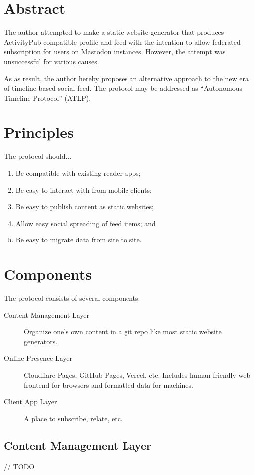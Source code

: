 \documentclass[a4paper,11pt]{article}
\begin{document}
\fulldoctitle



\section*{Abstract}
The author attempted to make a static website generator that produces ActivityPub-compatible profile and feed
with the intention to allow federated subscription for users on Mastodon instances.
However, the attempt was unsuccessful for various causes.

As as result, the author hereby proposes an alternative approach to the new era of timeline-based social feed.
The protocol may be addressed as ``Autonomous Timeline Protocol'' (ATLP).


\section{Principles}
The protocol should...
\begin{enumerate}
    \item Be compatible with existing reader apps;
    \item Be easy to interact with from mobile clients;
    \item Be easy to publish content as static websites;
    \item Allow easy social spreading of feed items; and
    \item Be easy to migrate data from site to site.
\end{enumerate}



\section{Components}
The protocol consists of several components.

\begin{description}
    \item[Content Management Layer] Organize one's own content in a git repo like most static website generators.
    \item[Online Presence Layer] Cloudflare Pages, GitHub Pages, Vercel, etc.
        Includes human-friendly web frontend for browsers and formatted data for machines.
    \item[Client App Layer] A place to subscribe, relate, etc.
\end{description}


\subsection{Content Management Layer}
// TODO
\end{document}
